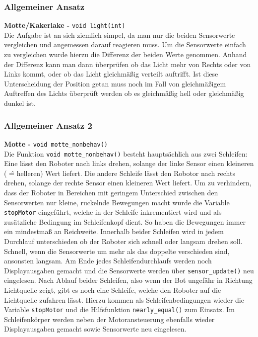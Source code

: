 \subsubsection{Allgemeiner Ansatz}

\noindent \textbf{Motte/Kakerlake - }\verb+void light(int)+\\

Die Aufgabe ist an sich ziemlich simpel, da man nur die beiden Sensorwerte vergleichen und angemessen darauf reagieren muss.
Um die Sensorwerte einfach zu vergleichen wurde hierzu die Differenz der beiden Werte genommen.
Anhand der Differenz kann man dann überprüfen ob das Licht mehr von Rechts oder von Links kommt, oder ob das Licht gleichmäßig verteilt auftrifft.
Ist diese Unterscheidung der Position getan muss noch im Fall von gleichmäßigem Auftreffen des Lichts überprüft werden ob es gleichmäßig hell oder gleichmäßig dunkel ist.



\subsubsection{Allgemeiner Ansatz 2 }

\textbf{Motte - }\verb+void motte_nonbehav()+\\

Die Funktion \verb+void motte_nonbehav()+ besteht hauptsächlich aus zwei Schleifen: Eine lässt den Roboter nach links drehen, solange der linke Sensor einen kleineren ( \^= helleren) Wert liefert. Die andere Schleife lässt den Robotor nach rechts drehen, solange der rechte Sensor einen kleineren Wert liefert. Um zu verhindern, dass der Roboter in Bereichen mit geringem Unterschied zwischen den Sensorwerten nur kleine, ruckelnde Bewegungen macht wurde die Variable \verb+stopMotor+ eingeführt, welche in der Schleife inkrementiert wird und als zusätzliche Bedingung im Schleifenkopf dient. So haben die Bewegungen immer ein mindestmaß an Reichweite.
Innerhalb beider Schleifen wird in jedem Durchlauf unterschieden ob der Roboter sich schnell oder langsam drehen soll. Schnell, wenn die Sensorwerte um mehr als das doppelte verschieden sind, ansonsten langsam.
Am Ende jedes Schleifendurchlaufs werden noch Displayausgaben gemacht und die Sensorwerte werden über \verb+sensor_update()+ neu eingelesen.
Nach Ablauf beider Schleifen, also wenn der Bot ungefähr in Richtung Lichtquelle zeigt, gibt es noch eine Schleife, welche den Roboter auf die Lichtquelle zufahren lässt. Hierzu kommen als Schleifenbedingungen wieder die Variable \verb+stopMotor+ und die Hilfsfunktion \verb+nearly_equal()+ zum Einsatz. Im Schleifenkörper werden neben der Motoransteuerung ebenfalls wieder Displayausgaben gemacht sowie Sensorwerte neu eingelesen.\\

